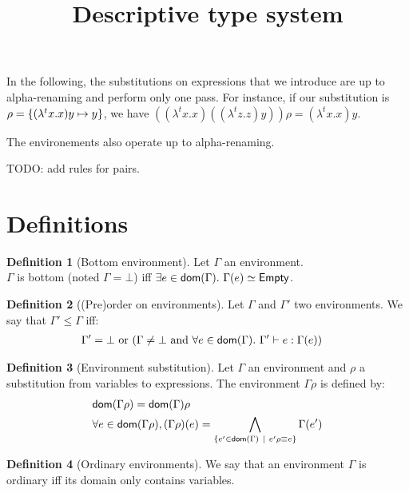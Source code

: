 \documentclass[a4paper]{article}
\title{\vspace{1.5cm}Descriptive type system}
\author{}
\date{\vspace{-5ex}}
\theoremstyle{definition}
\newtheorem{definition}{Definition}
\begin{document}
  \maketitle

  In the following, the substitutions on expressions that we introduce are up to alpha-renaming and perform only one pass.
  For instance, if our substitution is $\rho=\{(\lambda^t x. x) y \mapsto y\}$, we have $((\lambda^t x. x)((\lambda^t z. z) y))\rho = (\lambda^t x. x) y$.
  
  The environements also operate up to alpha-renaming.

  TODO: add rules for pairs.

    \section{Definitions}

    \begin{definition}[Bottom environment]
      Let $\Gamma$ an environment.\\
      $\Gamma$ is bottom (noted $\Gamma = \bot$) iff $\exists e\in\dom\Gamma.\ \Gamma(e)\simeq\Empty$.
    \end{definition}

      \begin{definition}[(Pre)order on environments]
        Let $\Gamma$ and $\Gamma'$ two environments. We say that $\Gamma' \leq \Gamma$ iff:
        \begin{align*}
          &\Gamma'=\bot \text{ or } (\Gamma\neq\bot \text{ and } \forall e \in \textsf{dom}(\Gamma).\ \Gamma' \vdash e : \Gamma(e))
        \end{align*}
      \end{definition}
    
      \begin{definition}[Environment substitution]
        Let $\Gamma$ an environment and $\rho$ a substitution from variables to expressions.
        The environment $\Gamma\rho$ is defined by:
        \begin{align*}
          &\textsf{dom}(\Gamma\rho) = \textsf{dom}(\Gamma) \rho\\
          &\forall e \in \textsf{dom}(\Gamma\rho), (\Gamma\rho)(e) = \bigwedge_{\{e' \in \textsf{dom}(\Gamma) ~|~ e'\rho\equiv e\}}\Gamma(e')
        \end{align*}
      \end{definition}
    
      \begin{definition}[Ordinary environments]
        We say that an environment $\Gamma$ is ordinary iff its domain only contains variables.
      \end{definition}
\end{document}
